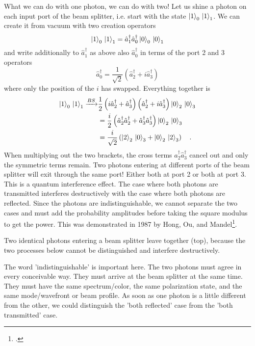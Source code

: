 What we can do with one photon, we can do with two! Let us shine a photon on each input port of the beam splitter, i.e. start with the state $\ket{1}_0 \, \ket{1}_1 $. We can create it from vacuum with two creation operators
\begin{equation}
    \ket{1}_0 \,  \ket{1}_1 = \hat{a}^\dagger_1 \hat{a}^\dagger_0 \ket{0}_0 \,  \ket{0}_1 
\end{equation}
and write additionally to $ \hat{a}^\dagger_1$ as above also  $\hat{a}^\dagger_0$ in terms of the port 2 and 3 operators 
\begin{equation}
    \hat{a}^\dagger_0 = \frac{1}{\sqrt{2}} \left(  \hat{a}^\dagger_2 + i \hat{a}^\dagger_3 \right)
\end{equation}
where only the position of the $i$ has swapped. Everything together is
\begin{align}
    \ket{1}_0 \,  \ket{1}_1  \xrightarrow{BS} & \frac{1}{2} 
    \left( i \hat{a}^\dagger_2 +  \hat{a}^\dagger_3\right) 
     \left( \hat{a}^\dagger_2 + i \hat{a}^\dagger_3\right) 
      \ket{0}_2 \,  \ket{0}_3 \\
      & = \frac{i}{2} 
      \left(  \hat{a}^\dagger_2  \hat{a}^\dagger_2 +  \hat{a}^\dagger_3 \hat{a}^\dagger_3\right) 
        \ket{0}_2 \,  \ket{0}_3 \\
        & = \frac{i}{\sqrt{2}} 
        \left(    \ket{2}_2 \,  \ket{0}_3 +  \ket{0}_2 \,  \ket{2}_3 \right)  \quad .
\end{align}
When multiplying out the two brackets, the cross terms $\hat{a}^\dagger_2  \hat{a}^\dagger_3$ cancel out and only the symmetric terms remain.  Two photons entering at different ports of the beam splitter will exit through the same port! Either both at port 2 or both at port 3. This is a quantum interference effect. The case where both photons are transmitted interferes destructively with the case where both photons are reflected. Since the photons are indistinguishable, we cannot separate the two cases and must add the probability amplitudes before taking the square modulus to get the power. This was demonstrated in 1987 by Hong, Ou, and Mandel\footcite{HOM87}.

\begin{marginfigure}
    \caption{Two identical photons entering a beam splitter leave together (top), because the two processes below cannot be distinguished and interfere destructively.}
\end{marginfigure}


The word 'indistinguishable' is important here. The two photons must agree in every conceivable way. They must arrive at the beam splitter at the same time. They must have the same spectrum/color, the same polarization state, and the same mode/wavefront or beam profile. As soon as one photon is a little different from the other, we could distinguish the 'both reflected' case from the 'both transmitted' case.
 
